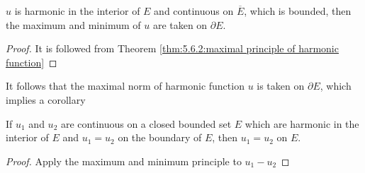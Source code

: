 
\begin{theorem}\label{thm:5.6.2:maximal principle of harmonic function on closed subset}
    $ u $ is harmonic in the interior  of  $ E $ and continuous on  $ \overline{E} $, which is bounded, then the maximum  and minimum of  $ u  $ are taken on  $ \partial E  $.
\end{theorem}
\begin{proof}
    It is followed from Theorem \ref{thm:5.6.2:maximal principle of harmonic function}
\end{proof}
It follows that the maximal norm of harmonic function $ u  $ is taken on  $ \partial E $, which implies a corollary 
\begin{corollary}\label{cor:5.6.2:u1=u2 iff u1=u2 on the boundary}
    If  $ u_1 $ and  $ u_2  $ are continuous on a closed bounded set  $ E  $ which are harmonic in the interior of  $ E  $ and  $ u_1=u_2  $ on the boundary of  $ E  $, then  $ u_1=u_2  $ on $ E  $.
\end{corollary}
\begin{proof}
    Apply the maximum and minimum principle to  $ u_1-u_2 $ 
\end{proof}
